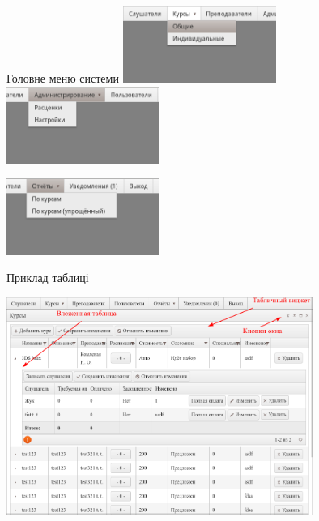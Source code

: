 \documentclass{beamer}
\begin{document}
\begin{frame}{\fn Головне меню системи}
\includegraphics[width=5cm]{scrns/menu1.png}\quad
\includegraphics[width=5cm]{scrns/menu2.png}
\begin{center}
\includegraphics[width=5cm]{scrns/menu3.png}
\end{center}
\end{frame}
\begin{frame}{\fn Приклад таблиці}
\begin{center}
\includegraphics[width=10cm]{scrns/scrn3.png}
\end{center}
\end{frame}
\end{document}
